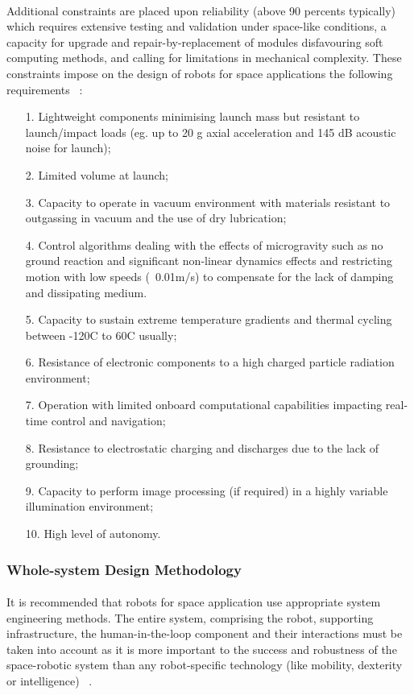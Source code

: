 \paragraph{}Additional constraints are placed upon reliability (above 90 percents typically) which requires extensive testing and validation under space-like conditions, a capacity for upgrade and repair-by-replacement of modules disfavouring soft computing methods, and calling for limitations in mechanical complexity. These constraints impose on the design of robots for space applications the following requirements ~\cite{Ellery2003}:
\begin{enumerate}
	\item[1.]{Lightweight components minimising launch mass but resistant to launch/impact loads (eg. up to 20 g axial acceleration and 145 dB acoustic noise for launch); }
	\item[2.]{Limited volume at launch; }
	\item[3.]{Capacity to operate in vacuum environment with materials resistant to outgassing in vacuum and the use of dry lubrication; }
	\item[4.]{Control algorithms dealing with the effects of microgravity such as no ground reaction and significant non-linear dynamics effects and restricting motion with low speeds (~0.01m/s) to compensate for the lack of damping and dissipating medium.}
	\item[5.]{Capacity to sustain extreme temperature gradients and thermal cycling between -120C to 60C usually; }
	\item[6.]{Resistance of electronic components to a high charged particle radiation environment;}
	\item[7.]{Operation with limited onboard computational capabilities impacting real-time control and navigation;}
	\item[8.]{Resistance to electrostatic charging and discharges due to the lack of grounding;}
	\item[9.]{Capacity to perform image processing (if required) in a highly variable illumination environment;}
	\item[10.]{High level of autonomy.}
\end{enumerate}

\subsubsection{Whole-system Design Methodology}
\paragraph{}It is recommended that robots for space application use appropriate system engineering methods.  The entire system, comprising the robot, supporting infrastructure, the human-in-the-loop component and their interactions must be taken into account as it is more important to the success and robustness of the space-robotic system than any robot-specific technology (like mobility, dexterity or intelligence) ~\cite{Pedersen2003}.

